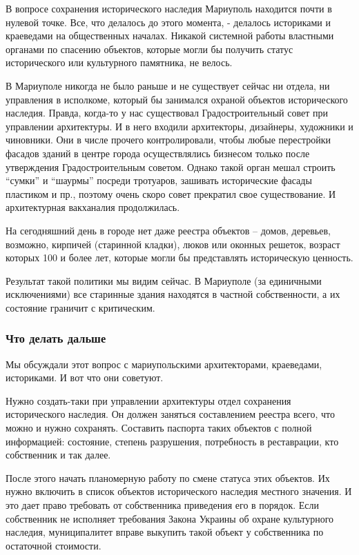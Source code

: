 В вопросе сохранения исторического наследия Мариуполь находится почти в нулевой
точке. Все, что делалось до этого момента, - делалось историками и краеведами
на общественных началах. Никакой системной работы властными органами по
спасению объектов, которые могли бы получить статус исторического или
культурного памятника, не велось.

В Мариуполе никогда не было раньше и не существует сейчас ни отдела, ни
управления в исполкоме, который бы занимался охраной объектов исторического
наследия. Правда, когда-то у нас существовал Градостроительный совет при
управлении архитектуры. И в него входили архитекторы, дизайнеры, художники и
чиновники. Они в числе прочего контролировали, чтобы любые перестройки фасадов
зданий в центре города осуществлялись бизнесом только после утверждения
Градостроительным советом. Однако такой орган  мешал строить \enquote{сумки} и
\enquote{шаурмы} посреди тротуаров, зашивать исторические фасады пластиком и
пр., поэтому очень скоро совет прекратил свое существование. И архитектурная
вакханалия продолжилась.

На сегодняшний день в городе нет даже реестра объектов – домов, деревьев,
возможно, кирпичей (старинной кладки), люков или оконных решеток, возраст
которых 100 и более лет,  которые могли бы представлять  историческую ценность.

Результат такой политики мы видим сейчас. В Мариуполе (за единичными
исключениями) все старинные здания находятся в частной собственности, а их
состояние граничит с критическим.

\subsubsection{Что делать дальше}

Мы обсуждали этот вопрос с мариупольскими архитекторами, краеведами,
историками. И вот что они советуют.

Нужно создать-таки при управлении архитектуры отдел сохранения исторического
наследия. Он должен заняться составлением реестра всего, что можно и нужно
сохранять. Составить паспорта таких объектов с полной информацией: состояние,
степень разрушения, потребность в реставрации, кто собственник и так далее. 

После этого начать планомерную работу по смене статуса этих объектов. Их нужно
включить в список объектов исторического наследия местного значения. И это дает
право требовать от собственника приведения его в порядок. Если собственник не
исполняет требования Закона Украины об охране культурного наследия,
муниципалитет вправе выкупить такой объект у собственника по остаточной
стоимости. 


